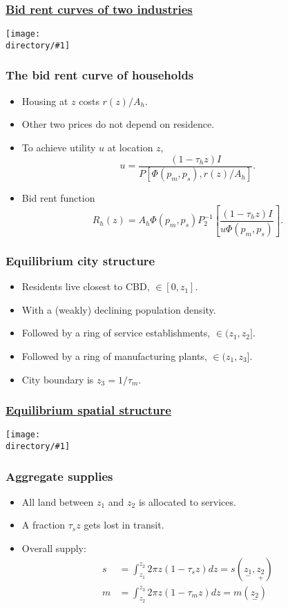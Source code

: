 \documentclass[handout,compress,mathserif]{beamer}
\newcommand{\directory}{figures}
\newcommand{\widefigure}[2]{\begin{frame}\frametitle{\hyperlink{#1back}{#2}}\hypertarget{#1}{{\begin{center}\texttt{[image: \\directory/\#1]}\end{center}}}\end{frame}}
\begin{document}
\widefigure{bid-rent-2}{Bid rent curves of two industries}

\begin{frame}\frametitle{The bid rent curve of households}
\begin{itemize}
    \item Housing at $z$ costs $r(z)/A_h$.
    \item Other two prices do not depend on residence.
    \item To achieve utility $u$ at location $z$,
    \[
    u = \frac{(1-\tau_h z) I}{P[\Phi(p_m,p_s),r(z)/A_h]}.
    \]
    \item Bid rent function
    \[
    R_h(z) = A_h\Phi(p_m,p_s)P_2^{-1}\left[\frac{(1-\tau_h z) I}{u\Phi(p_m,p_s)}\right].
    \]
\end{itemize}
\end{frame}



\begin{frame}\frametitle{Equilibrium city structure}
\begin{itemize}
    \item Residents live closest to CBD, $\in[0,z_1]$.
    \item With a (weakly) declining population density.
    \item Followed by a ring of service establishments, $\in(z_1,z_2]$.
    \item Followed by a ring of manufacturing plants, $\in(z_1,z_3]$.
    \item City boundary is $z_3 = 1/\tau_m$.
\end{itemize}
\end{frame}

\widefigure{bid-rent-3}{Equilibrium spatial structure}


\begin{frame}\frametitle{Aggregate supplies}
\begin{itemize}
    \item All land between $z_1$ and $z_2$ is allocated to services.
    \item A fraction $\tau_s z$ gets lost in transit.
    \item Overall supply:
    \begin{align*}
    s &= \int_{z_1}^{z_2}2\pi z (1-\tau_s z) dz = s(\underset{-}{z_1},\underset{+}{z_2})\\
    m &= \int_{z_2}^{z_3}2\pi z (1-\tau_m z) dz = m(\underset{-}{z_2})
    \end{align*}
\end{itemize}
\end{frame}
\end{document}
